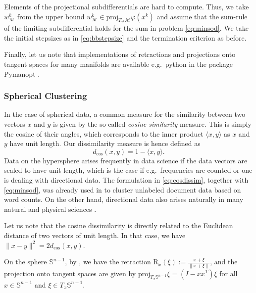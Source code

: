 \documentclass[a4paper, 12pt]{article}
\numberwithin{equation}{section}
\theoremstyle{bolddef}
\theoremstyle{definition}
\theoremstyle{boldplain}
\newcommand{\xk}{x^k}
\newcommand{\wk}{w^k}
\newcommand{\proj}{\mathrm{proj}}
\newcommand{\retr}{\mathrm{R}}
\begin{document}
Elements of the projectional subdifferentials are hard to compute. Thus, we take $\wk_\mathcal{M}$ from the upper bound $\wk_\mathcal{M} \in \proj_{T_{\xk} \mathcal{M}} \varphi(\xk)$ and assume that the sum-rule of the limiting subdifferential holds for the sum in problem \eqref{eq:minsod}. We take the initial stepsizes as in \eqref{eq:bbstepsize} and the termination criterion as before.

Finally, let us note that implementations of retractions and projections onto tangent spaces for many manifolds are available e.g.\ python in the package Pymanopt \cite{Townsend2016}.

\subsubsection{Spherical Clustering}

In the case of spherical data, a common measure for the similarity between two vectors $x$ and $y$ is given by the so-called \emph{cosine similarity} measure. This is simply the cosine of their angles, which corresponds to the inner product $\langle x, y\rangle$ as $x$ and $y$ have unit length. Our dissimilarity measure is hence defined as
\begin{equation}\label{eq:cosdissim}
	d_{\cos}(x, y) = 1- \langle x, y\rangle.
\end{equation}
Data on the hypersphere arises frequently in data science if the data vectors are scaled to have unit length, which is the case if e.g.\ frequencies are counted or one is dealing with directional data. The formulation in \eqref{eq:cosdissim}, together with \eqref{eq:minsod}, was already used in \cite{Dhillon2001} to cluster unlabeled document data based on word counts. On the other hand, directional data also arises naturally in many natural and physical sciences \cite{Golzy2016}.

Let us note that the cosine dissimilarity is directly related to the Euclidean distance of two vectors of unit length. In that case, we have $\|x-y\|^2 = 2 d_{\cos}(x, y)$.

On the sphere $\mathbb{S}^{n-1}$, by \cite{Absil2008}, we have the retraction $\retr_x (\xi) := \frac{x+\xi}{\|x+\xi\|}$,
and the projection onto tangent spaces are given by $\proj_{T_x\mathbb{S}^{n-1}} \xi = (I- xx^T) \xi$ for all $x \in \mathbb{S}^{n-1}$ and $\xi \in T_x \mathbb{S}^{n-1}$.
\end{document}
